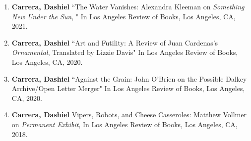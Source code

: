 \begin{enumerate}
\item \textbf{Carrera, Dashiel} ``The Water Vanishes: Alexandra Kleeman on \textit{Something New Under the Sun}, " In Los Angeles Review of Books, Los Angeles, CA, 2021.\\
\item \textbf{Carrera, Dashiel} ``Art and Futility: A Review of Juan Cardenas's \textit{Ornamental}, Translated by Lizzie Davis" In Los Angeles Review of Books, Los Angeles, CA, 2020.\\
\item \textbf{Carrera, Dashiel} ``Against the Grain: John O'Brien on the Possible Dalkey Archive/Open Letter Merger" In Los Angeles Review of Books, Los Angeles, CA, 2020. \\
\item \textbf{Carrera, Dashiel} Vipers, Robots, and Cheese Casseroles: Matthew Vollmer on \textit{Permanent Exhibit}, In Los Angeles Review of Books, Los Angeles, CA, 2018.\\


 \end{enumerate}